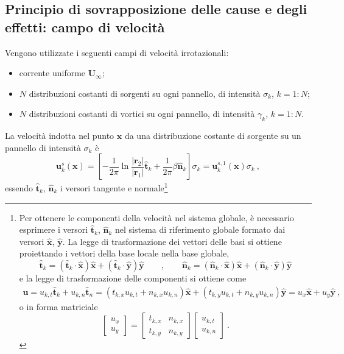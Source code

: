 \subsection{Principio di sovrapposizione delle cause e degli effetti: campo di velocità}
Vengono utilizzate i seguenti campi di velocità irrotazionali:
\begin{itemize}
 \item corrente uniforme $\bm{U}_{\infty}$;
 \item $N$ distribuzioni costanti di sorgenti su ogni pannello, di intensità $\sigma_k$, $k=1:N$; 
 \item $N$ distribuzioni costanti di vortici su ogni pannello, di intensità $\gamma_k$, $k=1:N$.
\end{itemize}
La velocità indotta nel punto $\bm{x}$ da una distribuzione costante di sorgente su un pannello di intensità $\sigma_k$ è
\begin{equation}
  \bm{u}^s_k(\bm{x}) = \left[
  - \dfrac{1}{2\pi} \ln \dfrac{|\bm{r}_2|}{|\bm{r}_1|} \bm{\hat{t}}_k 
  + \dfrac{1}{2\pi} \beta \bm{\hat{n}}_k \right] \sigma_k =
  \bm{u}^{s,1}_k(\bm{x}) \sigma_k \ ,
\end{equation}
essendo $\bm{\hat{t}}_k$, $\bm{\hat{n}}_k$ i versori tangente e normale\footnote{
    Per ottenere le componenti della velocità nel sistema globale, è necessario esprimere i versori $\bm{\hat{t}}_k$, $\bm{\hat{n}}_k$ nel sistema di riferimento globale formato dai versori $\bm{\hat{x}}$, $\bm{\hat{y}}$. La legge di trasformazione dei vettori delle basi si ottiene proiettando i vettori della base locale nella base globale,
    \begin{equation}
       \bm{\hat{t}}_k =( \bm{\hat{t}}_k \cdot \bm{\hat{x}}) \bm{\hat{x}} + 
                       ( \bm{\hat{t}}_k \cdot \bm{\hat{y}}) \bm{\hat{y}} \qquad , \qquad 
       \bm{\hat{n}}_k =( \bm{\hat{n}}_k \cdot \bm{\hat{x}}) \bm{\hat{x}} + 
                       ( \bm{\hat{n}}_k \cdot \bm{\hat{y}}) \bm{\hat{y}} 
    \end{equation}
 e la legge di trasformazione delle componenti si ottiene come
    \begin{equation} \begin{aligned}
      \bm{u} = u_{k,t} \bm{\hat{t}}_k +  u_{k,n} \bm{\hat{t}}_n =
        ( t_{k,x} u_{k,t} + n_{k,x} u_{k,n} ) \bm{\hat{x}} + 
        ( t_{k,y} u_{k,t} + n_{k,y} u_{k,n} ) \bm{\hat{y}} = 
        u_x \bm{\hat{x}} + 
        u_y \bm{\hat{y}} \ , 
    \end{aligned} \end{equation}
  o in forma matriciale
  \begin{equation}
      \left[ \begin{array}{c} u_x \\ u_y \end{array} \right] =
      \left[ \begin{array}{cc} t_{k,x} & n_{k,x} \\
                               t_{k,y} & n_{k,y} \end{array} \right]
      \left[ \begin{array}{c} u_{k,t} \\ u_{k,n} \end{array} \right] \  .
  \end{equation}
}
